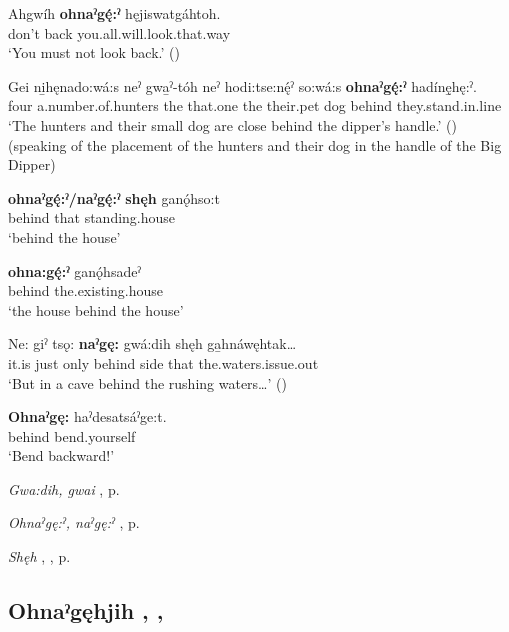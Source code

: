 \ea
\label{ex:opart14}
\gll Ahgwíh \textbf{ohnaˀgę́:ˀ} hęjiswatgáhtoh.\\
don’t back you.all.will.look.that.way\\
\glt ‘You must not look back.’ (\cite{carrier_legends_2013})
\z

\ea
\label{ex:opart15}
\gll Gei ni̱hęnado:wá:s neˀ gwa̱ˀ-tóh neˀ hodi:tse:nę́ˀ so:wá:s \textbf{ohnaˀgę́:ˀ} hadínę̱hę:ˀ.\\
four a.number.of.hunters the that.one the their.pet dog behind they.stand.in.line\\
\glt ‘The hunters and their small dog are close behind the dipper’s handle.’ (\cite{carrier_legends_2013})  (speaking of the placement of the hunters and their dog in the handle of the Big Dipper)
\z

\ea
\label{ex:opart16}
\gll \textbf{ohnaˀgę́:ˀ/naˀgę́:ˀ} \textbf{shęh} ganǫ́hso:t\\
behind that standing.house\\
\glt ‘behind the house’
\z

\ea
\label{ex:opart17}
\gll \textbf{ohna:gę́:ˀ} ganǫ́hsadeˀ\\
behind the.existing.house\\
\glt ‘the house behind the house’
\z

\ea
\label{ex:opart18}
\gll Ne: giˀ tsǫ: \textbf{naˀgę:} gwá:dih shęh ga̱hnáwęhtak…\\
it.is just only behind side that the.waters.issue.out\\
\glt ‘But in a cave behind the rushing waters…’ (\cite{carrier_legends_2013})
\z

\ea
\label{ex:opart19}
\gll \textbf{Ohnaˀgę:} haˀdesatsáˀge:t.\\
behind bend.yourself\\
\glt ‘Bend backward!’
\z

\begin{CayugaRelated}
\item \textit{Gwa:dih, gwai} , p. \pageref{p:[gwa:dih]}\\
\item \textit{Ohnaˀgę:ˀ, naˀgę:ˀ} , p. \pageref{p:[ohnaˀgę:ˀ]}\\
\item \textit{Shęh} , , p. \pageref{p:[shęh] `because’}
\end{CayugaRelated}


\subsection*{\textbf{Ohnaˀgęhjih} , , } \label{p:[ohnaˀgęhjih] ‘late’}

